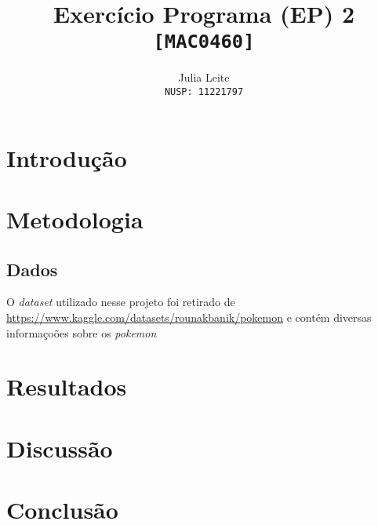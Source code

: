 \documentclass{article}
\title{Exercício Programa (EP) 2\\
    \large \texttt{[MAC0460]}}
\author{Julia Leite\\
    \large \texttt{NUSP: 11221797}}
\begin{document}
    
\maketitle

\tableofcontents

\section{Introdução}

\section{Metodologia}

\subsection{Dados}

O \textit{dataset} utilizado nesse projeto foi retirado de \url{https://www.kaggle.com/datasets/rounakbanik/pokemon} e contém diversas informaçoões sobre os \textit{pokemon} 

\section{Resultados}

\section{Discussão}

\section{Conclusão}
\end{document}
